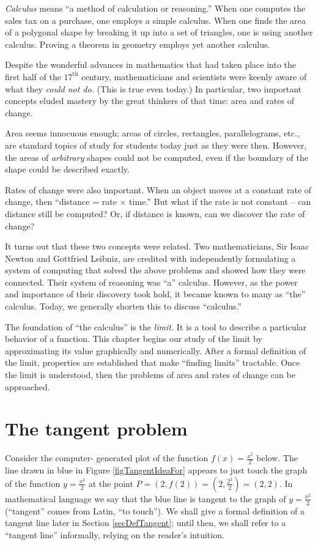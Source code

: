 
\textit{Calculus} means ``a method of calculation or reasoning.'' When one computes the sales tax on a purchase, one employs a simple calculus. When one finds the area of a polygonal shape by breaking it up into a set of triangles, one is using another calculus. Proving a theorem in geometry employs yet another calculus.

Despite the wonderful advances in mathematics that had taken place into the first half of the $17^\text{th}$ century, mathematicians and scientists were keenly aware of what they \textit{could not do.} (This is true even today.) In particular, two important concepts eluded mastery by the great thinkers of that time: area and rates of change. 

Area seems innocuous enough; areas of circles, rectangles, parallelograms, etc., are standard topics of study for students today just as they were then. However, the areas of \textit{arbitrary} shapes could not be computed, even if the boundary of the shape could be described exactly. 

Rates of change were also important. When an object moves at a constant rate of change, then ``distance = rate $\times $ time.'' But what if the rate is not constant -- can distance still be computed? Or, if distance is known, can we discover the rate of change?

It turns out that these two concepts were related. Two mathematicians, Sir Isaac Newton and Gottfried Leibniz, are credited with independently formulating a system of computing that solved the above problems and showed how they were connected. Their system of reasoning was ``a'' calculus. However, as the power and importance of their discovery took hold, it became known to many as ``the'' calculus. Today, we generally shorten this to discuss ``calculus.''

The foundation of ``the calculus'' is the \textit{limit.} It is a tool to describe a particular behavior of a function. This chapter begins our study of the limit by approximating its value graphically and numerically. After a formal definition of the limit, properties are established that make ``finding limits'' tractable. Once the limit is understood, then the problems of area and rates of change can be approached.

\section{The tangent problem}\label{sec:TangentProblem} %
Consider the computer- generated plot of the function $f(x)=\frac{x^2}2$ below. The line drawn in blue in Figure \ref{figTangentIdeaFor} appears to just touch the graph of the function $y=\frac{x^2}2$ at the point $P=(2,f(2))=(2, \frac{2^2}{2}) =(2,2)$. In mathematical language we say that the blue line is tangent to the graph of $ y=\frac{x^2}2$ (``tangent'' comes from Latin, ``to touch''). We shall give a formal definition of a tangent line later in Section \ref{secDefTangent}; until then, we shall refer to a ``tangent line'' informally, relying on the reader's intuition.

